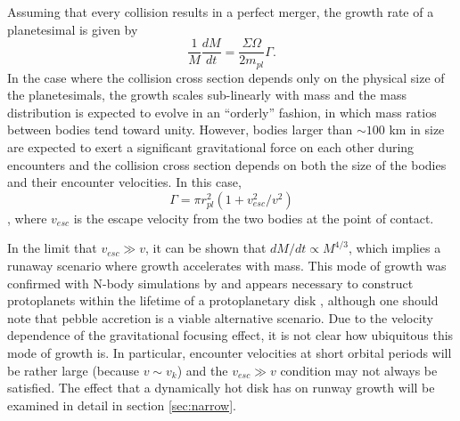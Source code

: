Assuming that every collision results in a perfect merger, the growth rate of a planetesimal is given by
\begin{equation}\label{eq:growth}
	\frac{1}{M}\frac{dM}{dt} = \frac{\Sigma \Omega}{2 m_{pl}} \Gamma.
\end{equation}
\noindent In the case where the collision cross section depends only
on the physical size of the planetesimals, the growth scales sub-linearly
with mass and the mass distribution is expected to evolve in an
``orderly'' fashion, in which mass ratios between bodies tend toward unity. However, bodies larger than $\sim 100$ km in size are expected to exert a significant gravitational force on each other during encounters and the collision cross section depends on both the size of the bodies and their encounter velocities. In this case, 
\begin{equation}\label{eq:gravfocus}
	\Gamma = \pi r_{pl}^2 \left( 1 + v_{esc}^2 / v^2 \right)
\end{equation}
\cite{safronov69}, where $v_{esc}$ is the escape velocity from the two bodies at the point of contact.

In the limit that $v_{esc} \gg v$, it can be shown that $dM/dt \propto
M^{4/3}$, which implies a runaway scenario where growth
accelerates with mass. This mode of growth was confirmed with N-body
simulations by \cite{kokubo96} and appears necessary to construct
protoplanets within the lifetime of a protoplanetary disk \cite{lissauer87}, although one should note that pebble accretion \cite{lambrechts12, lambrechts14, bitsch15} is a viable alternative scenario. Due to the
velocity dependence of the gravitational focusing effect, it is not clear how ubiquitous this mode of growth is. In particular, encounter velocities at short orbital periods will be rather large (because $v \sim v_{k}$) and the $v_{esc} \gg v$ condition may not always be satisfied. The effect that a dynamically hot disk has on runway growth will be examined in detail in section \ref{sec:narrow}.

